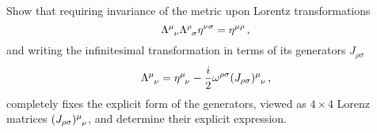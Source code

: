 \begin{ex} \label{ex_4} 
    Show that requiring invariance of the metric upon Lorentz transformations
    \begin{equation}
        \tensor{\Lambda}{^\mu_\nu} \tensor{\Lambda}{^\rho_\sigma} \g^{\nu \sigma} = \g^{\mu \rho} \, ,
        \label{Eq_Ex4_Lambda_prop_1}
    \end{equation}
    and writing the infinitesimal transformation in terms of its generators $J_{\rho \sigma}$
    \begin{equation}
    \label{lorentz_algebra1}
        \tensor{\Lambda}{^\mu_\nu} = \tensor{\g}{^\mu_\nu} - \frac{i}{2} \omega^{\rho \sigma} \tensor{(J_{\rho \sigma})}{^\mu_\nu} \, ,
    \end{equation}
    completely fixes the explicit form of the generators, viewed as $4 \times 4$ Lorenz matrices $\tensor{(J_{\rho \sigma})}{^\mu_\nu}$, and determine their explicit expression. 
\end{ex}


